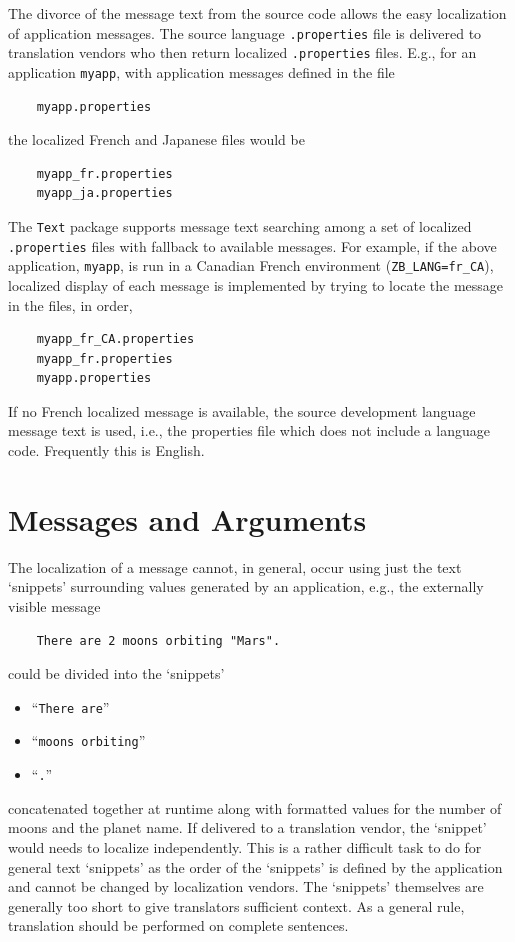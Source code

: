 The divorce of the message text from the source code allows the easy
localization of application messages.  The source language \texttt{.properties}
file is delivered to translation vendors who then return localized
\texttt{.properties} files.  E.g., for an application \texttt{myapp}, with
application messages defined in the file
\begin{verbatim}
    myapp.properties
\end{verbatim}
the localized French and Japanese files would be
\begin{verbatim}
    myapp_fr.properties
    myapp_ja.properties
\end{verbatim}

The \texttt{Text} package supports message text searching among a set of
localized \texttt{.properties} files with fallback to available messages.
For example, if the above application, \texttt{myapp}, is run in a Canadian
French environment (\texttt{ZB\_LANG=fr\_CA}), localized display of each message
is implemented by trying to locate the message in the files, in order,
\begin{verbatim}
    myapp_fr_CA.properties
    myapp_fr.properties
    myapp.properties
\end{verbatim}
If no French localized message is available, the source development language
message text is used, i.e., the properties file which does not include a
language code.  Frequently this is English.

\section{Messages and Arguments}

The localization of a message cannot, in general, occur using just the
text `snippets' surrounding values generated by an application, e.g., the
externally visible message
\begin{verbatim}
    There are 2 moons orbiting "Mars".
\end{verbatim}
could be divided into the `snippets'
\begin{itemize}
\item ``\texttt{There are}''
\item ``\texttt{moons orbiting}''
\item ``\texttt{.}''
\end{itemize}
concatenated together at runtime along with formatted values for the number
of moons and the planet name.
If delivered to a translation vendor, the `snippet' would needs to localize
independently. This is a rather
difficult task to do for general text `snippets' as the order of the
`snippets' is defined by the application and cannot be changed by localization
vendors.  The `snippets' themselves are generally too short to give
translators sufficient context.  As a general rule, translation should be
performed on complete sentences.

